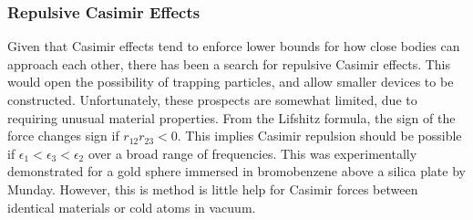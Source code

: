 





\subsubsection{Repulsive Casimir Effects}

Given that Casimir effects tend to enforce lower bounds for how close bodies can approach each other,
there has been a search for repulsive Casimir effects.  This would open the possibility
of trapping particles, and allow smaller devices to be constructed.  
Unfortunately, these prospects are somewhat limited, due to requiring unusual material properties.
From the Lifshitz formula, the sign of the force changes sign if $r_{12}r_{23}<0$.
This implies Casimir repulsion should be possible if $\epsilon_1<\epsilon_3<\epsilon_2$ over a broad range of frequencies.
This was experimentally demonstrated for a gold sphere immersed in bromobenzene above a silica plate
by Munday\etal\cite{Munday2009}.  However, this is method is little help for Casimir forces between
identical materials or cold atoms in vacuum.  

